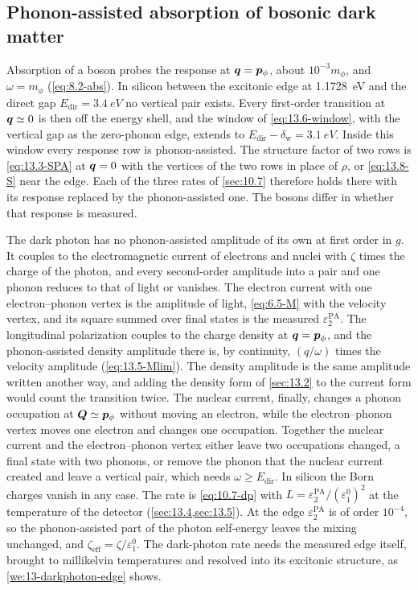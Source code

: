 \subsection{Phonon-assisted absorption of bosonic dark matter}

Absorption of a boson probes the response at $\bm{q} = \bm{p}_\phi$, about $10^{-3}m_\phi$, and $\omega = m_\phi$ (\cref{eq:8.2-abs}). In silicon between the excitonic edge at \SI{1.1728}{eV} and the direct gap $E_{\mathrm{dir}} = \SI{3.4}{eV}$ no vertical pair exists. Every first-order transition at $\bm{q} \simeq 0$ is then off the energy shell, and the window of \cref{eq:13.6-window}, with the vertical gap as the zero-phonon edge, extends to $E_{\mathrm{dir}} - \delta_{\mathrm{w}} = \SI{3.1}{eV}$. Inside this window every response row is phonon-assisted. The structure factor of two rows is \cref{eq:13.3-SPA} at $\bm{q} = 0$ with the vertices of the two rows in place of $\rho$, or \cref{eq:13.8-S} near the edge. Each of the three rates of \cref{sec:10.7} therefore holds there with its response replaced by the phonon-assisted one. The bosons differ in whether that response is measured.

The dark photon has no phonon-assisted amplitude of its own at first order in $g$. It couples to the electromagnetic current of electrons and nuclei with $\zeta$ times the charge of the photon, and every second-order amplitude into a pair and one phonon reduces to that of light or vanishes. The electron current with one electron--phonon vertex is the amplitude of light, \cref{eq:6.5-M} with the velocity vertex, and its square summed over final states is the measured $\varepsilon_2^{\mathrm{PA}}$. The longitudinal polarization couples to the charge density at $\bm{q} = \bm{p}_\phi$, and the phonon-assisted density amplitude there is, by continuity, $(q/\omega)$ times the velocity amplitude (\cref{eq:13.5-Mlim}). The density amplitude is the same amplitude written another way, and adding the density form of \cref{sec:13.2} to the current form would count the transition twice. The nuclear current, finally, changes a phonon occupation at $\bm{Q} \simeq \bm{p}_\phi$ without moving an electron, while the electron--phonon vertex moves one electron and changes one occupation. Together the nuclear current and the electron--phonon vertex either leave two occupations changed, a final state with two phonons, or remove the phonon that the nuclear current created and leave a vertical pair, which needs $\omega \ge E_{\mathrm{dir}}$. In silicon the Born charges vanish in any case. The rate is \cref{eq:10.7-dp} with $L = \varepsilon_2^{\mathrm{PA}}/(\varepsilon_1^0)^2$ at the temperature of the detector (\cref{sec:13.4,sec:13.5}). At the edge $\varepsilon_2^{\mathrm{PA}}$ is of order $10^{-4}$, so the phonon-assisted part of the photon self-energy leaves the mixing unchanged, and $\zeta_{\mathrm{eff}} = \zeta/\varepsilon_1^0$. The dark-photon rate needs the measured edge itself, brought to millikelvin temperatures and resolved into its excitonic structure, as \cref{we:13-darkphoton-edge} shows.

